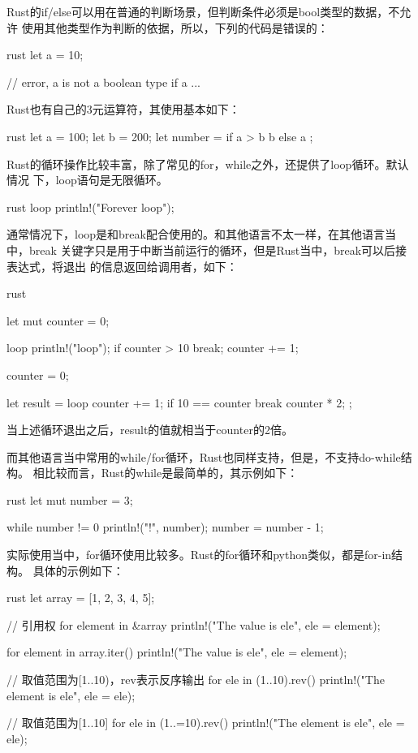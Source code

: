 Rust的if/else可以用在普通的判断场景，但判断条件必须是bool类型的数据，不允许
使用其他类型作为判断的依据，所以，下列的代码是错误的：
\begin{code-block}{rust}
let a = 10;

// error, a is not a boolean type
if a {
    ...
}
\end{code-block}

Rust也有自己的3元运算符，其使用基本如下：
\begin{code-block}{rust}
let a = 100;
let b = 200;
let number = if a > b {
    b
} else {
    a
};

\end{code-block}

Rust的循环操作比较丰富，除了常见的for，while之外，还提供了loop循环。默认情况
下，loop语句是无限循环。
\begin{code-block}{rust}
loop {
    println!("Forever loop");
}
\end{code-block}
通常情况下，loop是和break配合使用的。和其他语言不太一样，在其他语言当中，break
关键字只是用于中断当前运行的循环，但是Rust当中，break可以后接表达式，将退出
的信息返回给调用者，如下：
\begin{code-block}{rust}

let mut counter = 0;

loop {
    println!("loop");
    if counter > 10 {
        break;
    }
    counter += 1;
}

counter = 0;

let result = loop {
    counter += 1;
    if 10 == counter {
        break counter * 2;
    }
};
\end{code-block}
当上述循环退出之后，result的值就相当于counter的2倍。

而其他语言当中常用的while/for循环，Rust也同样支持，但是，不支持do-while结构。
相比较而言，Rust的while是最简单的，其示例如下：
\begin{code-block}{rust}
let mut number = 3;

while number != 0 {
    println!("{}!", number);
    number = number - 1;
}
\end{code-block}
实际使用当中，for循环使用比较多。Rust的for循环和python类似，都是for-in结构。
具体的示例如下：
\begin{code-block}{rust}
let array = [1, 2, 3, 4, 5];

// 引用权
for element in &array {
    println!("The value is {ele}", ele = element);
}

for element in array.iter() {
    println!("The value is {ele}", ele = element);
}

// 取值范围为[1..10)，rev表示反序输出
for ele in (1..10).rev() {
    println!("The element is {ele}", ele = ele);
}

// 取值范围为[1..10]
for ele in (1..=10).rev() {
    println!("The element is {ele}", ele = ele);
}
\end{code-block}


